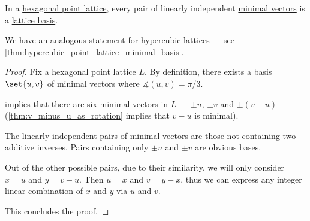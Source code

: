 \begin{corollary}\label{thm:hexagonal_point_lattice_minimal_basis}
  In a \hyperref[def:hexagonal_point_lattice]{hexagonal point lattice}, every pair of linearly independent \hyperref[def:minimal_lattice_vector]{minimal vectors} is a \hyperref[def:point_lattice_basis]{lattice basis}.
\end{corollary}
\begin{comments}
  \item We have an analogous statement for hypercubic lattices --- see \cref{thm:hypercubic_point_lattice_minimal_basis}.
\end{comments}
\begin{proof}
  Fix a hexagonal point lattice \( L \). By definition, there exists a basis \( \set{ u, v } \) of minimal vectors where \( \measuredangle(u, v) = \pi / 3 \).

   implies that there are six minimal vectors in \( L \) --- \( \pm u \), \( \pm v \) and \( \pm (v - u) \) (\cref{thm:v_minus_u_as_rotation} implies that \( v - u \) is minimal).

  The linearly independent pairs of minimal vectors are those not containing two additive inverses. Pairs containing only \( \pm u \) and \( \pm v \) are obvious bases.

  Out of the other possible pairs, due to their similarity, we will only consider \( x = u \) and \( y = v - u \). Then \( u = x \) and \( v = y - x \), thus we can express any integer linear combination of \( x \) and \( y \) via \( u \) and \( v \).

  This concludes the proof.
\end{proof}

